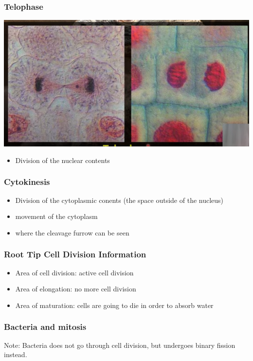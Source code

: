 \documentclass{article}
\begin{document}
\subsubsection*{Telophase}


\includegraphics*[scale=0.45]{telophase.png}


\begin{itemize}
    \item Division  of the nuclear contents
\end{itemize}
\subsubsection*{Cytokinesis}
\begin{itemize}
    \item Division of the cytoplasmic conents (the space outside of the nucleus)
    \item movement of the cytoplasm
    \item where the cleavage furrow can be seen
\end{itemize}
\subsubsection*{Root Tip Cell Division Information}
\begin{itemize}
    \item Area of cell division: active cell division
    \item Area of elongation: no more cell division
    \item Area of maturation: cells are going to die in order to absorb water
\end{itemize}
\subsubsection*{Bacteria and mitosis}
Note: Bacteria does not go through cell division, but undergoes binary fission instead.
\end{document}
